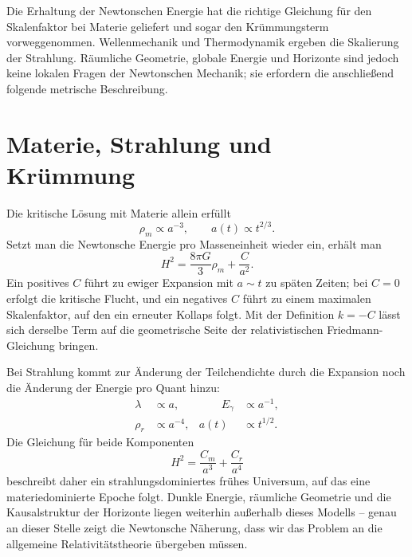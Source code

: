 \begin{classroomqa}
\end{classroomqa}

Die Erhaltung der Newtonschen Energie hat die richtige Gleichung für den Skalenfaktor bei Materie geliefert und sogar den Krümmungsterm vorweggenommen. Wellenmechanik und Thermodynamik ergeben die Skalierung der Strahlung. Räumliche Geometrie, globale Energie und Horizonte sind jedoch keine lokalen Fragen der Newtonschen Mechanik; sie erfordern die anschließend folgende metrische Beschreibung.

\section{Materie, Strahlung und Krümmung}

Die kritische Lösung mit Materie allein erfüllt
\begin{equation}
\rho_m\propto a^{-3},
\qquad
a(t)\propto t^{2/3}.
\end{equation}
Setzt man die Newtonsche Energie pro Masseneinheit wieder ein, erhält man
\begin{equation}
H^2=\frac{8\pi G}{3}\rho_m+\frac{C}{a^2}.
\end{equation}
Ein positives \(C\) führt zu ewiger Expansion mit \(a\sim t\) zu späten Zeiten; bei \(C=0\) erfolgt die kritische Flucht, und ein negatives \(C\) führt zu einem maximalen Skalenfaktor, auf den ein erneuter Kollaps folgt. Mit der Definition \(k=-C\) lässt sich derselbe Term auf die geometrische Seite der relativistischen Friedmann-Gleichung bringen.

Bei Strahlung kommt zur Änderung der Teilchendichte durch die Expansion noch die Änderung der Energie pro Quant hinzu:
\begin{equation}
\begin{aligned}
\lambda&\propto a,
&\qquad E_\gamma&\propto a^{-1},\\
\rho_r&\propto a^{-4},
& a(t)&\propto t^{1/2}.
\end{aligned}
\end{equation}
Die Gleichung für beide Komponenten
\begin{equation}
H^2=\frac{C_m}{a^3}+\frac{C_r}{a^4}
\end{equation}
beschreibt daher ein strahlungsdominiertes frühes Universum, auf das eine materiedominierte Epoche folgt. Dunkle Energie, räumliche Geometrie und die Kausalstruktur der Horizonte liegen weiterhin außerhalb dieses Modells – genau an dieser Stelle zeigt die Newtonsche Näherung, dass wir das Problem an die allgemeine Relativitätstheorie übergeben müssen.
